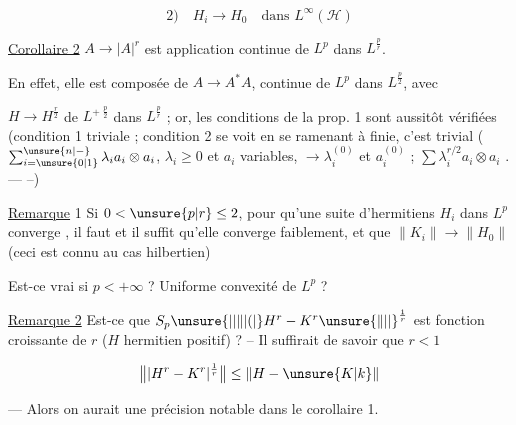 \[
\text{2)}\quad H_i\to H_0\quad\text{dans }L^\infty(\mathscr H)
\]

\uline{Corollaire 2} $A\to |A|^r$ est application continue de $L^p$ dans $L^{\frac pr}$.

En effet, elle est composée de $A\to A^*A$, continue de $L^p$ dans $L^{\frac p2}$, avec

$H\to H^{\frac r2}$ de $L^{+\;\frac p2}$ dans $L^{\frac pr}$ ; or, les conditions de la prop. 1 sont aussitôt vérifiées \unsure{(|\deleted{(}} (condition 1 triviale ; condition 2 se voit  en se ramenant à  finie,  c'est trivial ($\sum_{i=\unsure{0|1}}^{\unsure{n|-}}\lambda_i a_i\otimes a_i$, $\lambda_i\geq0$ et $a_i$ variables, $\to\lambda_i^{(0)}$ et $a_i^{(0)}$ ;   $\sum\lambda_i^{r/2}a_i\otimes a_i$ . --- --)

\uline{Remarque} 1 Si $0<\unsure{p|r}\leq2$, pour qu'une suite d'hermitiens $H_i$ dans $L^p$ converge , il faut et il suffit qu'elle converge faiblement, et que $\|K_i\|\to\|H_0\|$ (ceci est connu au cas hilbertien)

\margin{!}

Est-ce vrai si $p<+\infty$ ? Uniforme convexité de $L^p$ ?

\uline{Remarque 2} Est-ce que $S_p\unsure{\lvert|\lVert|(\lvert} H^r-K^r\unsure{\rVert|\rvert}^{\frac1r}$ est fonction croissante de $r$ ($H$ hermitien positif) ? -- Il suffirait de  savoir que $r<1$ 

\[
\bigl\|\lvert H^r-K^r\rvert^{\frac1r}\bigr\|\leq\|H-\unsure{K|k}\|
\]

--- Alors on aurait une précision notable dans le corollaire 1.


